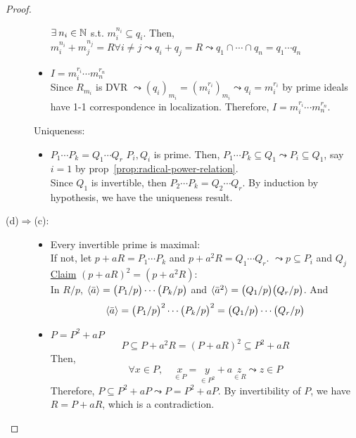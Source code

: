 \begin{theorem}
\begin{proof}
\begin{description}
\begin{itemize}
            $\exists n_i \in \Nb$ s.t. $m_i^{n_i} \subseteq q_i$. Then,
            $m_i^{n_i} + m_j^{n_j} = R \forall i \neq
            j \leadsto q_i + q_j  = R \leadsto q_1 \cap \cdots \cap q_n = q_1 \cdots
             q_n$
           \item $I = m_i^{r_i} \cdots m_n^{r_n}$ \\
             Since $R_{m_i}$ is DVR $\leadsto (q_i)_{m_i} = (m_i^{r_i})_{m_i} \leadsto
              q_i = m_i^{r_i}$ by prime ideals have 1-1 correspondence in localization. 
              Therefore,  $I = m_i^{r_i} \cdots m_n^{r_n}$. 
        \end{itemize}
        Uniqueness: 
        \begin{itemize}
          \item $P_1\cdots P_k = Q_1\cdots Q_r$ $P_i, Q_i$ is prime. Then, $P_1\cdots
             P_k \subseteq Q_1 \leadsto P_i \subseteq Q_1$, say $i = 1$ by 
             prop~\ref{prop:radical-power-relation}. \\
             Since $Q_1$ is invertible, then $P_2\cdots P_k = Q_2\cdots Q_r$. By 
             induction by hypothesis, we have the uniqueness result.
        \end{itemize}
      \item[\rm (d)$\Rightarrow$(c):] \mbox{}
        \begin{itemize}
          \item Every invertible prime is maximal: \\
            If not, let $p + aR = P_1 \cdots P_k$ and $p + a^2R = Q_1 \cdots Q_r$. 
            $\leadsto p \subseteq P_i$ and $Q_j$\\
            \underline{Claim} $(p + aR)^2 = (p + a^2R)$: \\
            In $R/p$, $\langle\bar{a}\rangle = \big(P_1/p\big) \cdots \big(P_k/p\big)$ and 
            $\langle\bar{a}^2\rangle= \big(Q_1/p\big)\big(Q_r/p\big)$. And
            \[
              \langle\bar{a}\rangle = \big(P_1/p\big)^2 \cdots \big(P_k/p\big)^2
              = \big(Q_1/p\big) \cdots \big(Q_r/p\big)
            \]
          \item $P = P^2 + aP$
             \[
               P \subseteq P + a^2R = (P + aR)^2 \subseteq P^2 + aR
             \]
             Then,
             \[
               \forall x \in P, \quad \underset{\in P}{x} = \underset{\in P^2}{y}
               + a\underset{\in R}{z} \leadsto z \in P
             \]
             Therefore, $P\subseteq P^2 + aP \leadsto P = P^2 + aP$. 
             By invertibility of $P$, we have $R = P + aR$, which is a contradiction.

\end{itemize}
\end{description}
\end{proof}
\end{theorem}
